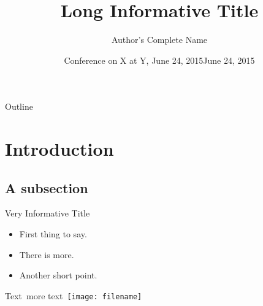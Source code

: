 \documentclass[demo]{beamer}%
\begin{document}
\title[Short title]{Long Informative Title}
\author[Shortened name]{Author’s Complete Name}
\date[2015/06/24]{Conference on X at Y, June 24, 2015}
\date{June 24, 2015}
\begin{frame}
  \titlepage
\end{frame}
\begin{frame}{Outline}
  \tableofcontents[pausesections]
\end{frame}
\section{Introduction}
\subsection{A subsection}
\begin{frame}{Very Informative Title}
  \begin{itemize}
    \item First thing to say.
    \item There is more.
    \item Another short point.
  \end{itemize}
  Text\pause\ more text\pause\ \texttt{[image: filename]}
\end{frame}
\end{document}
